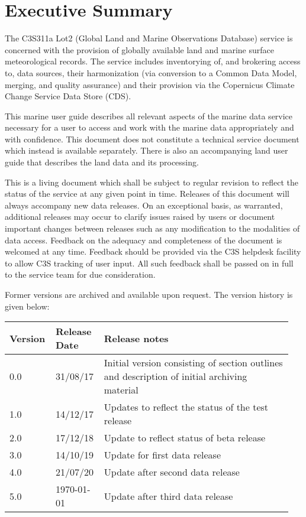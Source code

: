 \section*{Executive Summary}

The C3S311a Lot2 (Global Land and Marine Observations Database) service is concerned with the provision of globally available land and marine surface meteorological records. 
The service includes inventorying of, and brokering access to, data sources, their harmonization (via conversion to a Common Data Model, merging, and quality assurance) and their provision via the Copernicus Climate Change Service Data Store (CDS).

This marine user guide describes all relevant aspects of the marine data service necessary for a user to access and work with the marine data appropriately and with confidence. 
This document does not constitute a technical service document which instead is available separately. 
There is also an accompanying land user guide that describes the land data and its processing.

This is a living document which shall be subject to regular revision to reflect the status of the service at any given point in time. Releases of this document will always accompany new data releases. On an exceptional basis, as warranted, additional releases may occur to clarify issues raised by users or document important changes between releases such as any modification to the modalities of data access. Feedback on the adequacy and completeness of the document is welcomed at any time. Feedback should be provided via the C3S helpdesk facility to allow C3S tracking of user input. All such feedback shall be passed on in full to the service team for due consideration.

Former versions are archived and available upon request. The version history is given below:

\begin{table}[h]
\begin{tabular}{|p{0.15\linewidth}|p{0.15\linewidth}|p{0.65\linewidth}|}
\hline
\bfseries Version & \bfseries Release Date & \bfseries Release notes \\\hline
0.0	& 31/08/17	& Initial version consisting of section outlines and description of initial archiving material \\\hline
1.0	& 14/12/17	& Updates to reflect the status of the test release \\\hline
2.0	& 17/12/18	& Update to reflect status of beta release \\\hline
3.0	& 14/10/19	& Update for first data release \\\hline
4.0	& 21/07/20	& Update after second data release \\\hline
5.0 & \today    & Update after third data release \\\hline
\end{tabular}
\end{table}
\FloatBarrier
